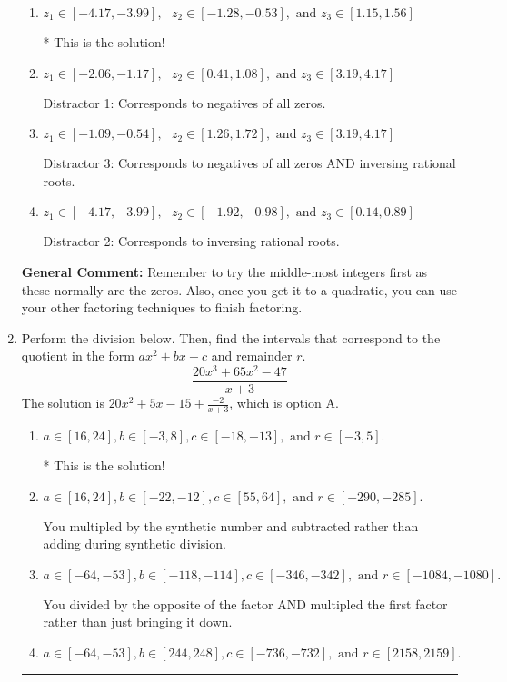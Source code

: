 \documentclass{extbook}[14pt]
\newcommand{\litem}[1]{\item #1

\rule{\textwidth}{0.4pt}}
\begin{document}
\begin{enumerate}
{\begin{enumerate}[label=\Alph*.]
 Distractor 4: Corresponds to moving factors from one rational to another.
\item \( z_1 \in [-4.17, -3.99], \text{   }  z_2 \in [-1.28, -0.53], \text{   and   } z_3 \in [1.15, 1.56] \)

* This is the solution!
\item \( z_1 \in [-2.06, -1.17], \text{   }  z_2 \in [0.41, 1.08], \text{   and   } z_3 \in [3.19, 4.17] \)

 Distractor 1: Corresponds to negatives of all zeros.
\item \( z_1 \in [-1.09, -0.54], \text{   }  z_2 \in [1.26, 1.72], \text{   and   } z_3 \in [3.19, 4.17] \)

 Distractor 3: Corresponds to negatives of all zeros AND inversing rational roots.
\item \( z_1 \in [-4.17, -3.99], \text{   }  z_2 \in [-1.92, -0.98], \text{   and   } z_3 \in [0.14, 0.89] \)

 Distractor 2: Corresponds to inversing rational roots.
\end{enumerate}

\textbf{General Comment:} Remember to try the middle-most integers first as these normally are the zeros. Also, once you get it to a quadratic, you can use your other factoring techniques to finish factoring.
}
\litem{
Perform the division below. Then, find the intervals that correspond to the quotient in the form $ax^2+bx+c$ and remainder $r$.
\[ \frac{20x^{3} +65 x^{2} -47}{x + 3} \]The solution is \( 20x^{2} +5 x -15 + \frac{-2}{x + 3} \), which is option A.\begin{enumerate}[label=\Alph*.]
\item \( a \in [16, 24], b \in [-3, 8], c \in [-18, -13], \text{ and } r \in [-3, 5]. \)

* This is the solution!
\item \( a \in [16, 24], b \in [-22, -12], c \in [55, 64], \text{ and } r \in [-290, -285]. \)

 You multipled by the synthetic number and subtracted rather than adding during synthetic division.
\item \( a \in [-64, -53], b \in [-118, -114], c \in [-346, -342], \text{ and } r \in [-1084, -1080]. \)

 You divided by the opposite of the factor AND multipled the first factor rather than just bringing it down.
\item \( a \in [-64, -53], b \in [244, 248], c \in [-736, -732], \text{ and } r \in [2158, 2159]. \)


\end{enumerate}}
\end{enumerate}
\end{document}
